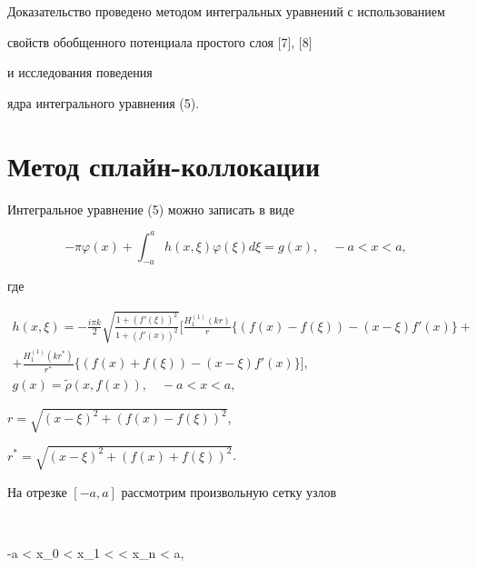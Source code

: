 Доказательство проведено методом интегральных уравнений с использованием


свойств обобщенного потенциала простого слоя [7], [8]


и исследования поведения


ядра интегрального уравнения (5).





\section{Метод сплайн-коллокации}





Интегральное уравнение (5) можно записать в виде


\begin{equation}


-\pi \varphi (x) + \int_{-a}^a h (x,\xi) \varphi (\xi) d\xi =


g (x), \quad -a < x < a,


\end{equation}


где


\begin{gather*}


h (x,\xi) = -\frac{i \pi k}{2}


\sqrt{\frac{1+(f'(\xi))^2}{1+(f'(x))^2}}\bigg[


\frac{H_1^{(1)}(k r)}{r}\{


(f(x) - f(\xi)) - (x - \xi) f'(x)\} +\\


%


+ \frac{H_1^{(1)}(k r^\ast)}{r^\ast}\{


(f(x) + f(\xi)) - (x - \xi) f'(x)\}\bigg], \\


%


g(x) = \widetilde{\rho} (x,f(x)), \quad -a < x < a,


\end{gather*}


$r=\sqrt{(x-\xi)^2 + (f(x)-f(\xi))^2}$,


$r^\ast=\sqrt{(x-\xi)^2 + (f(x)+f(\xi))^2}$.





На отрезке $[-a,a]$ рассмотрим произвольную сетку узлов


$$


-a < x_0 < x_1 < \dotsb < x_n < a,


